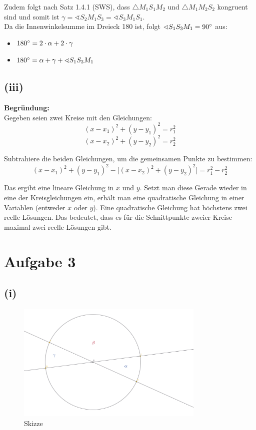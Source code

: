 \documentclass[12pt,a4paper]{article}
\begin{document}
\noindent Zudem folgt nach Satz 1.4.1 (SWS), dass $\triangle M_1S_1M_2$ und $\triangle M_1M_2S_2$ kongruent sind und somit ist $\gamma = \sphericalangle S_2M_1S_3 = \sphericalangle S_3M_1S_1$.\\

\noindent Da die Innenwinkelsumme im Dreieck 180 \degree  ist, folgt $\sphericalangle S_1S_3M_1 = 90 \degree$ aus:
\begin{itemize}
    \item $180 \degree = 2 \cdot \alpha + 2 \cdot \gamma$
    \item $180 \degree = \alpha + \gamma + \sphericalangle S_1S_3M_1$
\end{itemize}

\subsection*{(iii)}
\textbf{Begründung:} \\
Gegeben seien zwei Kreise mit den Gleichungen: 
\[ 
(x - x_1)^2 + (y - y_1)^2 = r_1^2 
\] 
\[ 
(x - x_2)^2 + (y - y_2)^2 = r_2^2 
\] 

\noindent Subtrahiere die beiden Gleichungen, um die gemeinsamen Punkte zu bestimmen: 
\[ 
(x - x_1)^2 + (y - y_1)^2 - \bigl[(x - x_2)^2 + (y - y_2)^2\bigr] = r_1^2 - r_2^2 
\] 

\noindent Das ergibt eine lineare Gleichung in \(x\) und \(y\). Setzt man diese Gerade wieder in eine der Kreisgleichungen ein, erhält man eine quadratische Gleichung in einer Variablen (entweder \(x\) oder \(y\)). Eine quadratische Gleichung hat höchstens zwei reelle Lösungen. Das bedeutet, dass es für die Schnittpunkte zweier Kreise maximal zwei reelle Lösungen gibt.

\newpage
\section*{Aufgabe 3}
\subsection*{(i)}
\begin{figure}[htbp]   
    \centering   
    \includegraphics[width=0.8\textwidth]{Blatt_01_Aufgabe_3_i.png}   
    \caption{Skizze}   
    \label{fig:mein_bild} 
\end{figure}
\end{document}
